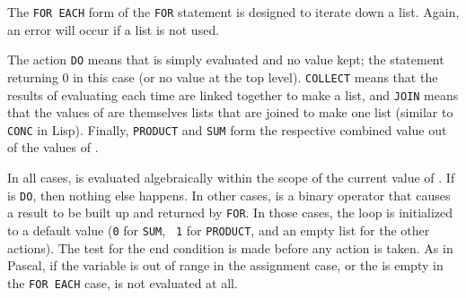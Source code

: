 The \texttt{FOR EACH} form of the \texttt{FOR} statement is
designed to iterate down a list.  Again, an error will occur if a list is
not used.

The action \texttt{DO} means that  is simply
evaluated and no value kept; the statement returning 0 in this case (or no
value at the top level). \texttt{COLLECT} means that the results of
evaluating  each time are linked together to make a list,
and \texttt{JOIN} means that the values of  are themselves
lists that are joined to make one list (similar to \texttt{CONC} in Lisp).
Finally, \texttt{PRODUCT} and \texttt{SUM}
form the respective combined value out of the values of .

In all cases,  is evaluated algebraically within the
scope of the current value of .  If  is
\texttt{DO}, then nothing else happens.  In other cases, 
is a binary operator that causes a result to be built up and
returned by \texttt{FOR}.  In those cases, the loop is
initialized to a default value (\texttt{0} for \texttt{SUM}, {\tt
1} for \texttt{PRODUCT}, and an empty list for the other
actions).  The test for the end condition is made before any action is
taken.  As in Pascal, if the variable is out of range in the assignment
case, or the  is empty in the \texttt{FOR EACH}
case,  is not evaluated at all.

